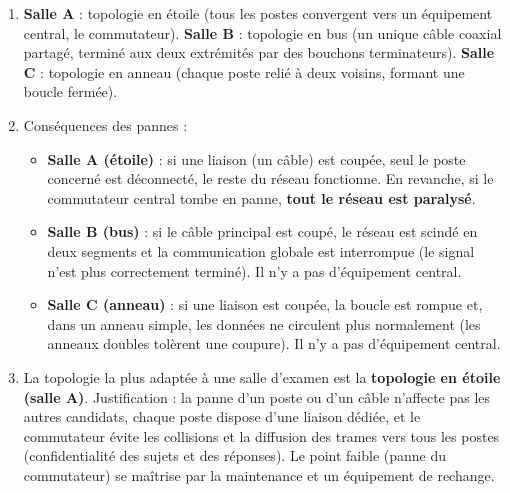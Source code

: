 \documentclass[11pt]{article}
\newcommand{\cle}[1]{{\popxbold\color{popdark}#1}}
\begin{document}
\begin{corrige}
\begin{enumerate}
  \item \textbf{Salle A} : topologie en \cle{étoile} (tous les postes convergent vers un équipement central, le commutateur). \textbf{Salle B} : topologie en \cle{bus} (un unique câble coaxial partagé, terminé aux deux extrémités par des \cle{bouchons terminateurs}). \textbf{Salle C} : topologie en \cle{anneau} (chaque poste relié à deux voisins, formant une boucle fermée).
  \item Conséquences des pannes :
  \begin{itemize}
    \item \textbf{Salle A (étoile)} : si une liaison (un câble) est coupée, seul le poste concerné est déconnecté, le reste du réseau fonctionne. En revanche, si le \cle{commutateur} central tombe en panne, \textbf{tout le réseau est paralysé}.
    \item \textbf{Salle B (bus)} : si le câble principal est coupé, le réseau est scindé en deux segments et la communication globale est interrompue (le signal n'est plus correctement terminé). Il n'y a pas d'équipement central.
    \item \textbf{Salle C (anneau)} : si une liaison est coupée, la boucle est rompue et, dans un anneau simple, les données ne circulent plus normalement (les anneaux doubles tolèrent une coupure). Il n'y a pas d'équipement central.
  \end{itemize}
  \item La topologie la plus adaptée à une salle d'examen est la \textbf{topologie en étoile (salle A)}. Justification : la panne d'un poste ou d'un câble n'affecte pas les autres candidats, chaque poste dispose d'une \cle{liaison dédiée}, et le commutateur évite les \cle{collisions} et la diffusion des trames vers tous les postes (confidentialité des sujets et des réponses). Le point faible (panne du commutateur) se maîtrise par la maintenance et un équipement de rechange.
\end{enumerate}
\end{corrige}
\end{document}
